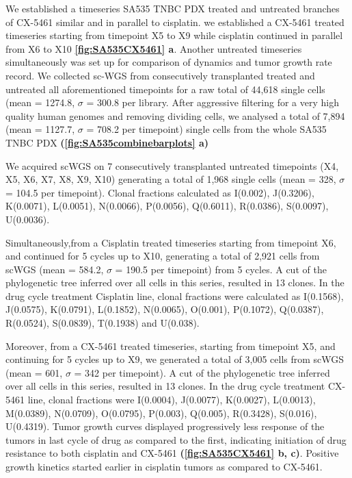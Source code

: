 We established a timeseries SA535 TNBC PDX treated and untreated branches of CX-5461 similar and in parallel to cisplatin.
we established a CX-5461 treated timeseries starting from timepoint X5 to X9 while cisplatin continued in parallel from X6 to X10  \textbf{\autoref{fig:SA535CX5461} a}. Another untreated timeseries simultaneously was set up for comparison of dynamics and tumor growth rate record.
We collected sc-WGS from consecutively transplanted treated and untreated all aforementioned timepoints for a raw total of 44,618 single cells (mean = 1274.8, $\sigma$ = 300.8 per library. After aggressive filtering for a very high quality human genomes and removing dividing cells, we analysed a total of 7,894 (mean = 1127.7, $\sigma$ = 708.2 per timepoint) single cells from the whole SA535 TNBC PDX \textbf{(\autoref{fig:SA535combinebarplots} a)}

We acquired scWGS on 7 consecutively transplanted untreated timepoints (X4, X5, X6, X7, X8, X9, X10) generating a total of 1,968 single cells (mean = 328, $\sigma$ = 104.5 per timepoint).
Clonal fractions calculated as I(0.002), J(0.3206), K(0.0071), L(0.0051), N(0.0066), P(0.0056), Q(0.6011), R(0.0386), S(0.0097), U(0.0036). 

Simultaneously,from a Cisplatin treated timeseries starting from timepoint X6, and continued for 5 cycles up to X10, generating a total of 2,921 cells from scWGS (mean = 584.2, $\sigma$ = 190.5 per timepoint) from 5 cycles. A cut of the phylogenetic tree inferred over all cells in this series, resulted in 13 clones.
In the drug cycle treatment Cisplatin line, clonal fractions were
calculated as I(0.1568), J(0.0575), K(0.0791), L(0.1852), N(0.0065), O(0.001), P(0.1072), Q(0.0387), R(0.0524), S(0.0839), T(0.1938) and U(0.038).

Moreover, from a CX-5461 treated timeseries, starting from timepoint X5, and continuing for 5 cycles up to X9, we generated a total of 3,005 cells from scWGS (mean = 601, $\sigma$ = 342 per timepoint). A cut of the phylogenetic tree inferred over all cells in this series, resulted in 13 clones. In the drug cycle treatment CX-5461 line, clonal fractions were I(0.0004), J(0.0077), K(0.0027), L(0.0013), M(0.0389), N(0.0709),  O(0.0795), P(0.003), Q(0.005), R(0.3428), S(0.016), U(0.4319).
Tumor growth curves displayed progressively less response of the tumors in last cycle of drug as compared to the first, indicating initiation of drug resistance to both cisplatin and CX-5461 \textbf{(\autoref{fig:SA535CX5461} b, c)}. Positive growth kinetics started earlier in cisplatin tumors as compared to CX-5461.

